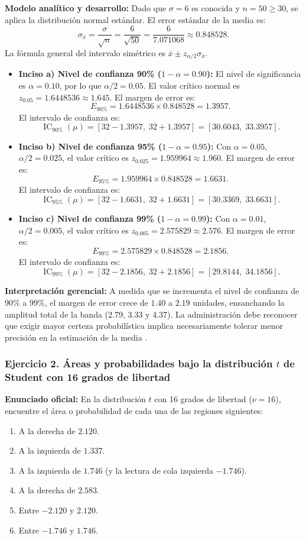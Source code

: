 {\textbf{Modelo analítico y desarrollo:}
Dado que $\sigma = 6$ es conocida y $n = 50 \ge 30$, se aplica la distribución normal estándar. El error estándar de la media es:
\[
  \sigma_{\bar{x}} = \frac{\sigma}{\sqrt{n}} = \frac{6}{\sqrt{50}} = \frac{6}{7.071068} \approx 0.848528.
\]
La fórmula general del intervalo simétrico es $\bar{x} \pm z_{\alpha/2} \sigma_{\bar{x}}$.
\begin{itemize}
  \item \textbf{Inciso a) Nivel de confianza 90\% ($1-\alpha = 0.90$):} El nivel de significancia es $\alpha = 0.10$, por lo que $\alpha/2 = 0.05$. El valor crítico normal es $z_{0.05} = 1.6448536 \approx 1.645$. El margen de error es:
  \[
    E_{90\%} = 1.6448536 \times 0.848528 = 1.3957.
  \]
  El intervalo de confianza es:
  \[
    \operatorname{IC}_{90\%}(\mu) = [32 - 1.3957, \; 32 + 1.3957] = [30.6043, \; 33.3957].
  \]
  \item \textbf{Inciso b) Nivel de confianza 95\% ($1-\alpha = 0.95$):} Con $\alpha = 0.05$, $\alpha/2 = 0.025$, el valor crítico es $z_{0.025} = 1.959964 \approx 1.960$. El margen de error es:
  \[
    E_{95\%} = 1.959964 \times 0.848528 = 1.6631.
  \]
  El intervalo de confianza es:
  \[
    \operatorname{IC}_{95\%}(\mu) = [32 - 1.6631, \; 32 + 1.6631] = [30.3369, \; 33.6631].
  \]
  \item \textbf{Inciso c) Nivel de confianza 99\% ($1-\alpha = 0.99$):} Con $\alpha = 0.01$, $\alpha/2 = 0.005$, el valor crítico es $z_{0.005} = 2.575829 \approx 2.576$. El margen de error es:
  \[
    E_{99\%} = 2.575829 \times 0.848528 = 2.1856.
  \]
  El intervalo de confianza es:
  \[
    \operatorname{IC}_{99\%}(\mu) = [32 - 2.1856, \; 32 + 2.1856] = [29.8144, \; 34.1856].
  \]
\end{itemize}
\textbf{Interpretación gerencial:} A medida que se incrementa el nivel de confianza de 90\% a 99\%, el margen de error crece de $1.40$ a $2.19$ unidades, ensanchando la amplitud total de la banda ($2.79$, $3.33$ y $4.37$). La administración debe reconocer que exigir mayor certeza probabilística implica necesariamente tolerar menor precisión en la estimación de la media \citep{anderson2012}.

\subsubsection*{Ejercicio 2. Áreas y probabilidades bajo la distribución $t$ de Student con 16 grados de libertad}
\textbf{Enunciado oficial:} En la distribución $t$ con 16 grados de libertad ($\nu = 16$), encuentre el área o probabilidad de cada una de las regiones siguientes:
\begin{enumerate}
  \item[a)] A la derecha de $2.120$.
  \item[b)] A la izquierda de $1.337$.
  \item[c)] A la izquierda de $1.746$ (y la lectura de cola izquierda $-1.746$).
  \item[d)] A la derecha de $2.583$.
  \item[e)] Entre $-2.120$ y $2.120$.
  \item[f)] Entre $-1.746$ y $1.746$.
\end{enumerate}

}
